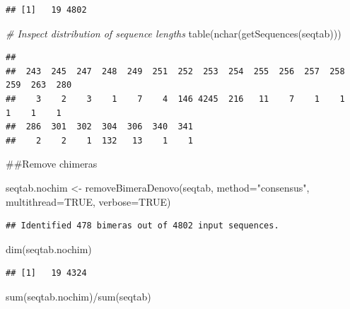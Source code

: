 \documentclass[
]{article}
\newenvironment{Shaded}{\begin{snugshade}}{\end{snugshade}}
\newcommand{\AttributeTok}[1]{\textcolor[rgb]{0.77,0.63,0.00}{#1}}
\newcommand{\CommentTok}[1]{\textcolor[rgb]{0.56,0.35,0.01}{\textit{#1}}}
\newcommand{\ConstantTok}[1]{\textcolor[rgb]{0.00,0.00,0.00}{#1}}
\newcommand{\FunctionTok}[1]{\textcolor[rgb]{0.00,0.00,0.00}{#1}}
\newcommand{\NormalTok}[1]{#1}
\newcommand{\OtherTok}[1]{\textcolor[rgb]{0.56,0.35,0.01}{#1}}
\newcommand{\SpecialCharTok}[1]{\textcolor[rgb]{0.00,0.00,0.00}{#1}}
\newcommand{\StringTok}[1]{\textcolor[rgb]{0.31,0.60,0.02}{#1}}
\begin{document}
\begin{verbatim}
## [1]   19 4802
\end{verbatim}

\begin{Shaded}
\begin{Highlighting}[]
\CommentTok{\# Inspect distribution of sequence lengths}
\FunctionTok{table}\NormalTok{(}\FunctionTok{nchar}\NormalTok{(}\FunctionTok{getSequences}\NormalTok{(seqtab)))}
\end{Highlighting}
\end{Shaded}

\begin{verbatim}
## 
##  243  245  247  248  249  251  252  253  254  255  256  257  258  259  263  280 
##    3    2    3    1    7    4  146 4245  216   11    7    1    1    1    1    1 
##  286  301  302  304  306  340  341 
##    2    2    1  132   13    1    1
\end{verbatim}

\#\#Remove chimeras

\begin{Shaded}
\begin{Highlighting}[]
\NormalTok{seqtab.nochim }\OtherTok{\textless{}{-}} \FunctionTok{removeBimeraDenovo}\NormalTok{(seqtab, }\AttributeTok{method=}\StringTok{"consensus"}\NormalTok{, }\AttributeTok{multithread=}\ConstantTok{TRUE}\NormalTok{, }\AttributeTok{verbose=}\ConstantTok{TRUE}\NormalTok{)}
\end{Highlighting}
\end{Shaded}

\begin{verbatim}
## Identified 478 bimeras out of 4802 input sequences.
\end{verbatim}

\begin{Shaded}
\begin{Highlighting}[]
\FunctionTok{dim}\NormalTok{(seqtab.nochim)}
\end{Highlighting}
\end{Shaded}

\begin{verbatim}
## [1]   19 4324
\end{verbatim}

\begin{Shaded}
\begin{Highlighting}[]
\FunctionTok{sum}\NormalTok{(seqtab.nochim)}\SpecialCharTok{/}\FunctionTok{sum}\NormalTok{(seqtab)}
\end{Highlighting}
\end{Shaded}
\end{document}
